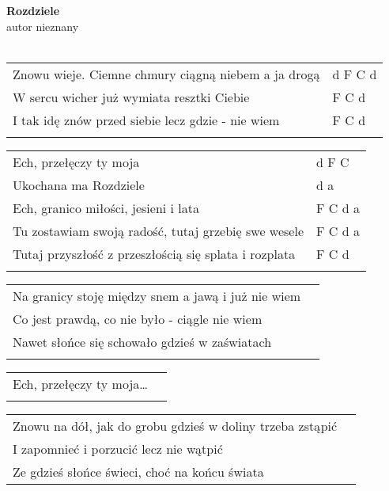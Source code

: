\documentclass[a5paper]{article}
\begin{document}


\noindent
\fontsize{12pt}{15pt}\selectfont
\textbf{Rozdziele} \\
\fontsize{8pt}{10pt}\selectfont
autor nieznany \\ \\
\fontsize{10pt}{12pt}\selectfont
{}
\begin{tabular}{@{}p{9.50cm}p{3cm}@{}}
\noindent
Znowu wieje. Ciemne chmury ciągną niebem a ja drogą & d F C d \\
W sercu wicher już wymiata resztki Ciebie & F C d \\
I tak idę znów przed siebie lecz gdzie - nie wiem & F C d \\ \\
\end{tabular}

\noindent
\begin{tabular}{@{}p{8.50cm}p{3cm}@{}}
Ech, przełęczy ty moja & d F C \\
Ukochana ma Rozdziele & d a \\
Ech, granico miłości, jesieni i lata & F C d a \\
Tu zostawiam swoją radość, tutaj grzebię swe wesele & F C d a \\
Tutaj przyszłość z przeszłością się splata i rozplata & F C d \\ \\
\end{tabular}

\noindent
\begin{tabular}{@{}p{8.50cm}p{3cm}@{}}
Na granicy stoję między snem a jawą i już nie wiem \\
Co jest prawdą, co nie było - ciągle nie wiem \\
Nawet słońce się schowało gdzieś w zaświatach \\ \\
\end{tabular}

\noindent
\begin{tabular}{@{}p{8.50cm}p{3cm}@{}}
Ech, przełęczy ty moja… \\ \\
\end{tabular}

\noindent
\begin{tabular}{@{}p{10.50cm}p{3cm}@{}}
Znowu na dół, jak do grobu gdzieś w doliny trzeba zstąpić \\
I zapomnieć i porzucić lecz nie wątpić \\
Ze gdzieś słońce świeci, choć na końcu świata 
\end{tabular}
\end{document}
